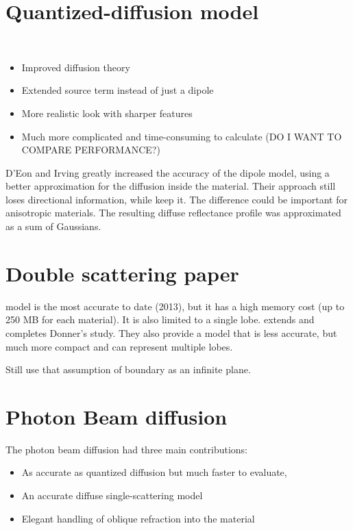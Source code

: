 \section{Quantized-diffusion model}
\cite{D'Eon:2011:QMR:1964921.1964951}\\
\begin{itemize}
    \item Improved diffusion theory
    \item Extended source term instead of just a dipole
    \item More realistic look with sharper features
    \item Much more complicated and time-consuming to calculate (DO I WANT TO COMPARE PERFORMANCE?)
\end{itemize}
D’Eon and Irving  greatly increased the accuracy of the dipole model, using a
better approximation for the diffusion inside the material. Their approach still
loses directional information, while \cite{holzschuch:hal-00760054} keep it. The
difference could be important for anisotropic materials.
The resulting diffuse reflectance profile was approximated as a sum of Gaussians.

\section{Double scattering paper}
\cite{Donner:2009:EBM} model is the most accurate to date (2013), but it has a
high memory cost (up to 250 MB for each material). It is also limited to a
single lobe. \cite{holzschuch:hal-00760054} extends and completes Donner's
study. They also provide a model that is less accurate, but much more compact
and can represent multiple lobes.

Still use that assumption of boundary as an infinite plane.

\section{Photon Beam diffusion}
The photon beam diffusion \cite{Habel:2013:PBD:2600890.2600896} had three main
contributions:
\begin{itemize}
    \item As accurate as quantized diffusion but much faster to evaluate,
    \item An accurate diffuse single-scattering model
    \item Elegant handling of oblique refraction into the material
\end{itemize}

